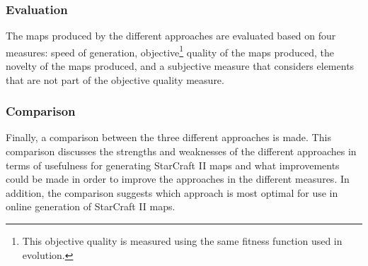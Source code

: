 \subsubsection{Evaluation}
The maps produced by the different approaches are evaluated based on four measures: speed of generation, objective\footnote{This objective quality is measured using the same fitness function used in evolution.} quality of the maps produced, the novelty of the maps produced, and a subjective measure that considers elements that are not part of the objective quality measure.
\subsubsection{Comparison}
Finally, a comparison between the three different approaches is made. This comparison discusses the strengths and weaknesses of the different approaches in terms of usefulness for generating StarCraft II maps and what improvements could be made in order to improve the approaches in the different measures. In addition, the comparison suggests which approach is most optimal for use in online generation of StarCraft II maps. 